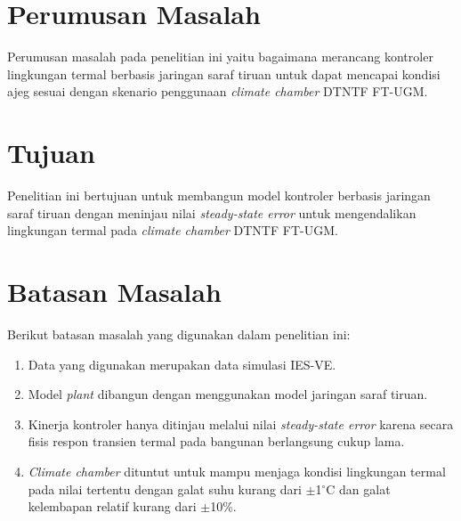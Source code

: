
\section{Perumusan Masalah}
Perumusan masalah pada penelitian ini yaitu bagaimana merancang kontroler lingkungan termal berbasis jaringan saraf tiruan untuk dapat mencapai kondisi ajeg sesuai dengan skenario penggunaan \textit{climate chamber} DTNTF FT-UGM.

\section{Tujuan}
Penelitian ini bertujuan untuk membangun model kontroler berbasis jaringan saraf tiruan dengan meninjau nilai \textit{steady-state error} untuk mengendalikan lingkungan termal pada \textit{climate chamber} DTNTF FT-UGM.

\break

\section{Batasan Masalah}
Berikut batasan masalah yang digunakan dalam penelitian ini:
\begin{enumerate}
	\item Data yang digunakan merupakan data simulasi IES-VE.
	\item Model \textit{plant} dibangun dengan menggunakan model jaringan saraf tiruan.
	\item Kinerja kontroler hanya ditinjau melalui nilai \textit{steady-state error} karena secara fisis respon transien termal pada bangunan berlangsung cukup lama.
	\item \textit{Climate chamber} dituntut untuk mampu menjaga kondisi lingkungan termal pada nilai tertentu dengan galat suhu kurang dari $\pm$1$^{\circ}$C dan galat kelembapan relatif kurang dari $\pm$10\%.
\end{enumerate}

